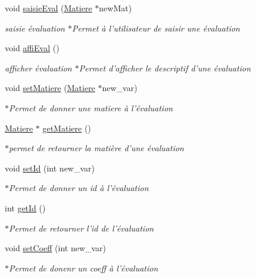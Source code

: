 \begin{DoxyCompactItemize}
void \hyperlink{class_evaluation_a7bca2f24b3cd48bc41220c4ad127a10f}{saisie\-Eval} (\hyperlink{class_matiere}{Matiere} $\ast$new\-Mat)
\begin{DoxyCompactList}\small\item\em saisie évaluation $\ast$\-Permet à l'utilisateur de saisir une évaluation \end{DoxyCompactList}\item 
void \hyperlink{class_evaluation_a3cb34d3397cceeff0e3ce51badc7cf83}{affi\-Eval} ()
\begin{DoxyCompactList}\small\item\em afficher évaluation $\ast$\-Permet d'afficher le descriptif d'une évaluation \end{DoxyCompactList}\item 
void \hyperlink{class_evaluation_a5093357701d653d150471933d86c905c}{set\-Matiere} (\hyperlink{class_matiere}{Matiere} $\ast$new\-\_\-var)
\begin{DoxyCompactList}\small\item\em $\ast$\-Permet de donner une matiere à l'évaluation \end{DoxyCompactList}\item 
\hyperlink{class_matiere}{Matiere} $\ast$ \hyperlink{class_evaluation_ab74c781aaf29c0c43ac5c04d9ff74065}{get\-Matiere} ()
\begin{DoxyCompactList}\small\item\em $\ast$permet de retourner la matière d'une évaluation \end{DoxyCompactList}\item 
void \hyperlink{class_evaluation_a9da8c5e1c7c580dda5d2e5509771dd5a}{set\-Id} (int new\-\_\-var)
\begin{DoxyCompactList}\small\item\em $\ast$\-Permet de donner un id à l'évaluation \end{DoxyCompactList}\item 
int \hyperlink{class_evaluation_a7321d761cd51da691fb1712e878852f6}{get\-Id} ()
\begin{DoxyCompactList}\small\item\em $\ast$\-Permet de retourner l'id de l'évaluation \end{DoxyCompactList}\item 
void \hyperlink{class_evaluation_a71abf2df2a50639d207b94d8cacd7206}{set\-Coeff} (int new\-\_\-var)
\begin{DoxyCompactList}\small\item\em $\ast$\-Permet de donenr un coeff à l'évaluation \end{DoxyCompactList}\item 

\end{DoxyCompactItemize}

